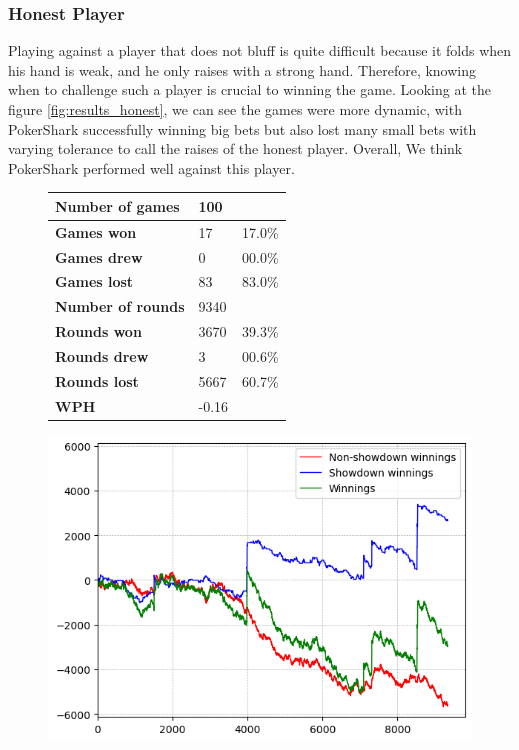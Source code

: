 \subsubsection{Honest Player}
Playing against a player that does not bluff is quite difficult because it folds when his hand is weak, and he only raises with a strong hand. Therefore, knowing when to challenge such a player is crucial to winning the game. Looking at the figure \ref{fig:results_honest}, we can see the games were more dynamic, with PokerShark successfully winning big bets but also lost many small bets with varying tolerance to call the raises of the honest player. Overall, We think PokerShark performed well against this player.
\begin{figure}[H]
    \centering
    \begin{minipage}{\textwidth}
        \begin{minipage}{0.40\textwidth}
            \begin{tabular}{|l|l|l|}
                \hline
                \textbf{Number of games}  & 100   &        \\ \hline
                \textbf{Games won}        & 17    & 17.0\% \\ \hline
                \textbf{Games drew}       & 0     & 00.0\%  \\ \hline
                \textbf{Games lost}       & 83    & 83.0\% \\ \hline
                \textbf{Number of rounds} & 9340  &        \\ \hline
                \textbf{Rounds won}       & 3670  & 39.3\% \\ \hline
                \textbf{Rounds drew}      & 3     & 00.6\%  \\ \hline
                \textbf{Rounds lost}      & 5667  & 60.7\% \\ \hline
                \textbf{WPH}              & -0.16 &        \\ \hline
            \end{tabular}
        \end{minipage}
        \hspace{0.05\textwidth}
        \begin{minipage}{0.5\textwidth}
            \includegraphics[width=\textwidth]{graphics/honest.png}

\end{minipage}
\end{minipage}
\end{figure}
